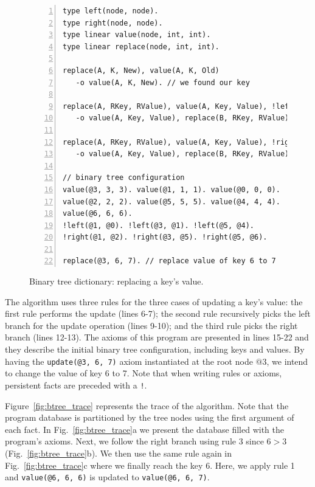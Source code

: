 {\scriptsize
\begin{figure}[h]
   \vspace{-0.5\intextsep}
\scriptsize\begin{Verbatim}[numbers=left]
type left(node, node).
type right(node, node).
type linear value(node, int, int).
type linear replace(node, int, int).

replace(A, K, New), value(A, K, Old)
   -o value(A, K, New). // we found our key

replace(A, RKey, RValue), value(A, Key, Value), !left(A, B), RKey < Key
   -o value(A, Key, Value), replace(B, RKey, RValue). // go left

replace(A, RKey, RValue), value(A, Key, Value), !right(A, B), RKey > Key
   -o value(A, Key, Value), replace(B, RKey, RValue). // go right

// binary tree configuration
value(@3, 3, 3). value(@1, 1, 1). value(@0, 0, 0).
value(@2, 2, 2). value(@5, 5, 5). value(@4, 4, 4).
value(@6, 6, 6).
!left(@1, @0). !left(@3, @1). !left(@5, @4). 
!right(@1, @2). !right(@3, @5). !right(@5, @6).

replace(@3, 6, 7). // replace value of key 6 to 7
\end{Verbatim}
\vspace{-0.5\intextsep}
\caption{Binary tree dictionary: replacing a key's value.}
  \label{code:btree_replace}
  \vspace{-0.5\intextsep}
\end{figure}
}

The algorithm uses three rules for the three cases of updating a key's value: the first rule performs the update
(lines 6-7); the second rule recursively picks the left branch for the update operation (lines 9-10); and the third
rule picks the right branch (lines 12-13).
The axioms of this program are presented in lines 15-22 and they describe the initial binary tree configuration,
including keys and values. By having the \texttt{update(@3, 6, 7)} axiom instantiated at the root node $@3$, we intend to
change the value of key 6 to 7.
Note that when writing rules or axioms, persistent facts are preceded with a \texttt{!}.

Figure~\ref{fig:btree_trace} represents the trace of the algorithm. Note that the program database is partitioned
by the tree nodes using the first argument of each fact. In Fig.~\ref{fig:btree_trace}a we present the database
filled with the program's axioms. Next, we follow the right branch using rule 3 since $6 > 3$ (Fig.~\ref{fig:btree_trace}b).
We then use the same rule again in Fig.~\ref{fig:btree_trace}c where we finally reach the key 6. Here, we apply rule 1 and
\texttt{value(@6, 6, 6)} is updated to \texttt{value(@6, 6, 7)}.

